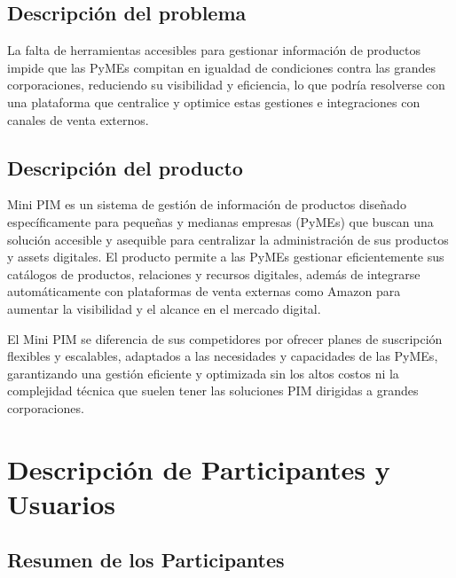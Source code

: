 \documentclass{article}
\begin{document}
\subsection{Descripción del problema}

La falta de herramientas accesibles para gestionar información de productos impide que las PyMEs compitan en igualdad de condiciones contra las grandes corporaciones, reduciendo su visibilidad y eficiencia, lo que podría resolverse con una plataforma que centralice y optimice estas gestiones e integraciones con canales de venta externos.

\subsection{Descripción del producto}

Mini PIM es un sistema de gestión de información de productos diseñado específicamente para pequeñas y medianas empresas (PyMEs) que buscan una solución accesible y asequible para centralizar la administración de sus productos y assets digitales. El producto permite a las PyMEs gestionar eficientemente sus catálogos de productos, relaciones y recursos digitales, además de integrarse automáticamente con plataformas de venta externas como Amazon para aumentar la visibilidad y el alcance en el mercado digital.

El Mini PIM se diferencia de sus competidores por ofrecer planes de suscripción flexibles y escalables, adaptados a las necesidades y capacidades de las PyMEs, garantizando una gestión eficiente y optimizada sin los altos costos ni la complejidad técnica que suelen tener las soluciones PIM dirigidas a grandes corporaciones.


\section{Descripción de Participantes y Usuarios}

\subsection{Resumen de los Participantes}
\end{document}
